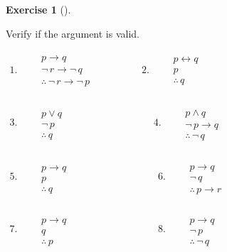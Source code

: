 \documentclass[
  letterpaper,
  10pt,
  reqno,
  twopage,
  openany]{book}
\theoremstyle{plain}
\theoremstyle{definition}
\newtheorem{exercise}{Exercise}[chapter]
\theoremstyle{definition}
\theoremstyle{definition}
\theoremstyle{plain}
\theoremstyle{plain}
\theoremstyle{remark}
\begin{document}
\leavevmode{}%
\begin{exercise}[]\label{exr-one}

Verify if the argument is valid.

\(\begin{array}{ll} 1. \qquad \begin{array}{l} p \rightarrow q \\ \neg \, r \rightarrow \neg \, q \\ \hline \therefore \, \neg \, r \rightarrow \neg \, p \end{array} & \qquad \qquad 2. \qquad \begin{array}{l} p\longleftrightarrow q\\ p \\ \hline \therefore \, q \end{array} \end{array}\)

\(\begin{array}{ll} 3. \qquad \begin{array}{l} \\ p\lor q\\ \neg \, p \\ \hline \therefore \, q \end{array} & \qquad \qquad \qquad \qquad 4. \qquad \begin{array}{l} \\ p\land q\\ \neg \, p \rightarrow q \\ \hline \therefore \, \neg \, q \end{array} \end{array}\)

\(\begin{array}{ll} 5. \qquad \begin{array}{l} \\ p\rightarrow q \\ p \\ \hline \therefore \, q \end{array} & \qquad \qquad \qquad \qquad 6. \qquad \begin{array}{l} \\ p\rightarrow q \\ \neg \, q \\ \hline \therefore \, p\rightarrow r \end{array} \end{array}\)

\(\begin{array}{ll} 7. \qquad \begin{array}{l} \\ p\rightarrow q \\ q \\ \hline \therefore \, p \end{array} & \qquad \qquad \qquad \qquad 8. \qquad \begin{array}{l} \\ p\rightarrow q \\ \neg \, p \\ \hline \therefore \, \neg \, q \end{array} \end{array}\)


\end{exercise}
\end{document}
